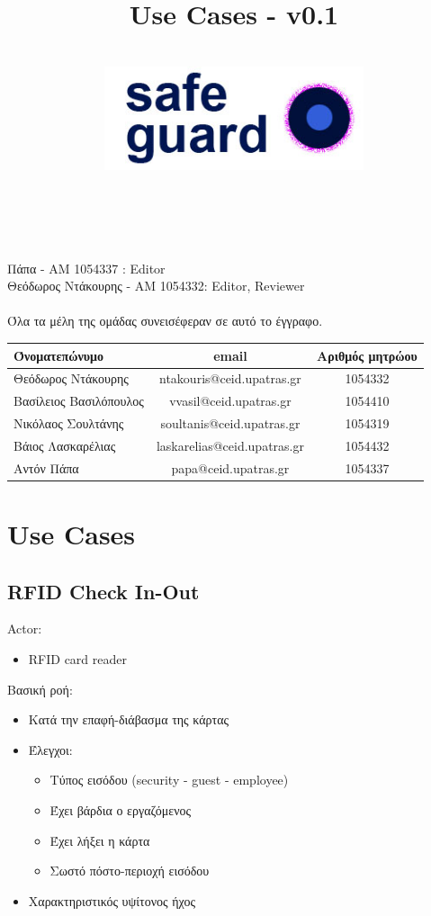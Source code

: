 \documentclass{article}
\title{Use Cases - v0.1}
\author{\\
\includegraphics[width=3in]{safeguard}\\[1ex]\\\\
}
\begin{document}
\maketitle

\newpage

 Πάπα - ΑΜ 1054337 : Editor \\
Θεόδωρος Ντάκουρης - AM 1054332: Editor, Reviewer\\\\
Όλα τα μέλη της ομάδας συνεισέφεραν σε αυτό το έγγραφο.
\\

\begin{tabular}{|l|c|c|}
\hline
Όνοματεπώνυμο & email & Αριθμός μητρώου  \\
\hline
Θεόδωρος Ντάκουρης & ntakouris@ceid.upatras.gr & 1054332 \\
Βασίλειος Βασιλόπουλος & vvasil@ceid.upatras.gr &  1054410 \\
Νικόλαος Σουλτάνης & soultanis@ceid.upatras.gr & 1054319  \\
Βάιος Λασκαρέλιας & laskarelias@ceid.upatras.gr & 1054432 \\
Αντόν Πάπα & papa@ceid.upatras.gr & 1054337 \\
\hline
\end{tabular}

\renewcommand{\contentsname}{Περιεχόμενα}
\tableofcontents

\newpage

\section{Use Cases}

\subsection{RFID Check In-Out}

\noindent Actor: 
\begin{itemize}
    \item RFID card reader
\end{itemize}

\noindent Βασική ροή:
\begin{itemize}
    \item Κατά την επαφή-διάβασμα της κάρτας
    \item Έλεγχοι: 
    \begin{itemize}
        \item Τύπος εισόδου (security - guest - employee)
        \item Έχει βάρδια ο εργαζόμενος
        \item Έχει λήξει η κάρτα 
        \item Σωστό πόστο-περιοχή εισόδου
    \end{itemize}
    \item Χαρακτηριστικός υψίτονος ήχος
\end{itemize}
\end{document}
